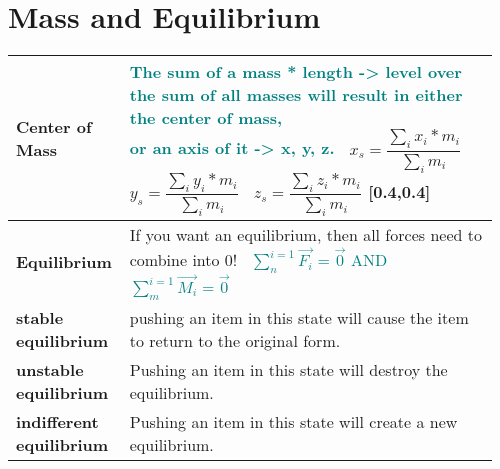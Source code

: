 \documentclass[main.tex,fontsize=8pt,paper=a4,paper=portrait,DIV=calc,]{scrartcl}
\begin{document}
\pagebreak 
\begin{table}[ht!]
\section{Mass and Equilibrium}
\begin{tabular}{|m{0.2\linewidth}|m{0.755\linewidth}|}
\hline 
\textbf{Center of Mass} & \minipg{
  \textbf{\textcolor{teal}{ The sum of a mass * length -> level over the sum of all masses will result in either the center of mass,\newline
  or an axis of it -> x, y, z.}}
}
{
\, \newline
\Huge \( x_s = \dfrac{\sum_i x_i * m_i }{\sum_i m_i} \)\newline
\, \newline
\Huge \( y_s = \dfrac{\sum_i y_i * m_i }{\sum_i m_i} \)\newline
\, \newline
\Huge \( z_s = \dfrac{\sum_i z_i * m_i }{\sum_i m_i} \)\newline}[0.4,0.4]\\
\hline
\textbf{Equilibrium} &
If you want an equilibrium, then all forces need to combine into 0!\newline
\, \newline
\Large \textcolor{teal}{\( \displaystyle\sum_{n}^{i=1}\vec{F_i} = \vec{0} \) AND \( \displaystyle\sum_{m}^{i=1} \vec{M_i} = \vec{0} \)}\newline
\normalsize \\
\hline
\textbf{stable equilibrium} &
pushing an item in this state will cause the item to return to the original form.
\\
\textbf{unstable equilibrium} & 
Pushing an item in this state will destroy the equilibrium.
\\
\textbf{indifferent equilibrium} &
Pushing an item in this state will create a new equilibrium.
\\
\hline
\end{tabular}

\end{table}
\end{document}
